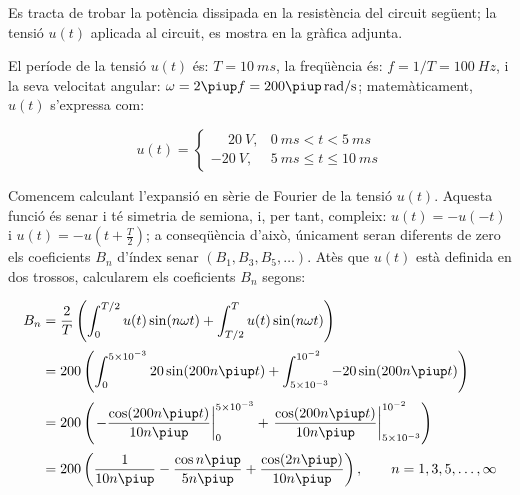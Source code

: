 \begin{exemple}\label{ex:CircuitFourier}
	\addcontentsxms{\CircuitFourier}
     Es tracta de trobar la potència
     dissipada en la resistència del circuit següent; la tensió $u(t)$ aplicada al circuit,
     es mostra en la gràfica adjunta.

    \begin{center}
        
    \end{center}

     El període de la tensió $u(t)$ és: $T=\qty{10}{ms}$, la freqüència és: $f=1/T=\qty{100}{Hz}$, i la
    seva velocitat angular: $\omega = 2\piup f = 200\piup\unit{\,rad/s}$;
    matemàticament, $u(t)$ s'expressa com:

    \[
    u(t) = \begin{cases} \phantom{-}\qty{20}{V}, & \qty{0}{ms} < t < \qty{5}{ms} \\
           \qty{-20}{V}, & \qty{5}{ms} \leq t \leq \qty{10}{ms} \end{cases}
    \]

    Comencem calculant l'expansió en sèrie de Fourier de la tensió
    $u(t)$. Aquesta funció és senar i té simetria de semiona, i, per tant,
     compleix: $u(t)=-u(-t)$ i $u(t) = -u(t+\frac{T}{2})$; a conseqüència   d'això, únicament seran diferents de zero els coeficients $B_n$ d'índex senar $(B_1,B_3,B_5,\ldots)$. Atès que
    $u(t)$ està definida en dos trossos, calcularem els coeficients
    $B_n$ segons:

    \[
    \begin{split}
        B_n &= \frac{2}{T} \left( \int_0^{T/2} u(t) \sin(n \omega t) +
        \int_{T/2}^{T} u(t) \sin(n \omega t) \right) \\[0.5ex]
        &= 200 \left( \int_0^{5\times 10^{-3}} 20 \sin(200 n \piup t) +
        \int_{5\times 10^{-3}}^{10^{-2}} -20 \sin(200 n \piup t) \right) \\[0.5ex]
        &= 200 \left( \left. -\frac{\cos(200 n \piup t)}{10 n \piup}\right|_0^{5\times 10^{-3}}
        +  \left.\frac{\cos(200 n \piup t)}{10 n \piup}\right|_{5\times
        10^{-3}}^{10^{-2}}\right) \\[0.5ex]
        &= 200\left( \frac{1}{10 n \piup} - \frac{\cos n \piup}{5 n \piup} +
        \frac{\cos (2 n \piup)}{10 n \piup}\right),
        \qquad n=1,3,5,\ldots,\infty
    \end{split}
    \]


\end{exemple}
